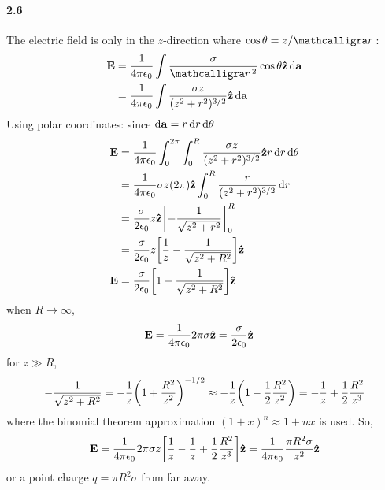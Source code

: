 \documentclass[../main.tex]{subfiles}
\begin{document}
\paragraph{2.6}
The electric field is only in the $z$-direction where $\cos\theta = z/\scriptr$:
\begin{align*}
    \vb{E} &= \frac{1}{4\pi\epsilon_0}
        \int \frac{\sigma}{\scriptr^2} \cos\theta \vu{z} \dd{\vb{a}} \\
    &= \frac{1}{4\pi\epsilon_0}
        \int \frac{\sigma z}{(z^2 + r^2)^{3/2}} \vu{z} \dd{\vb{a}}
\end{align*}
Using polar coordinates: since $\dd{\vb{a}} = r \dd{r} \dd{\theta} $
\begin{align*}
    \vb{E} &= \frac{1}{4\pi\epsilon_0}
        \int_0^{2\pi} \int_0^R \frac{\sigma z}{(z^2 + r^2)^{3/2}} \vu{z} r \dd{r} \dd{\theta} \\
    &= \frac{1}{4\pi\epsilon_0}
        \sigma z (2\pi) \vu{z} \int_0^R \frac{r}{(z^2 + r^2)^{3/2}} \dd{r} \\
    &= \frac{\sigma}{2\epsilon_0} z \vu{z} \qt[
            -\frac{1}{\sqrt{z^2 + r^2}}
        ]_0^R \\
    &= \frac{\sigma}{2\epsilon_0} z  \qt[
            \frac{1}{z} -\frac{1}{\sqrt{z^2 + R^2}}
        ] \vu{z} \\
    \vb E &= \frac{\sigma}{2\epsilon_0} \qt[1 - \frac{1}{\sqrt{z^2 + R^2}}] \vu{z}
\end{align*}
when $R \to \infty$,
\begin{align*}
    \vb{E} &= \frac{1}{4\pi\epsilon_0} 2\pi \sigma \vu{z} = \frac{\sigma}{2\epsilon_0} \vu{z}
\end{align*}
for $z \gg R$,
\begin{align*}
    -\frac{1}{\sqrt{z^2 + R^2}} = -\frac{1}{z} \qt(1 + \frac{R^2}{z^2})^{-1/2} \approx -\frac{1}{z}
    \qt(1 - \frac{1}{2} \frac{R^2}{z^2}) = -\frac{1}{z} + \frac{1}{2} \frac{R^2}{z^3}
\end{align*}
where the binomial theorem approximation $(1 + x)^n \approx 1 + nx$ is used. So,
\begin{align*}
    \vb{E} = \frac{1}{4\pi\epsilon_0} 2\pi \sigma z \qt[
        \frac{1}{z} - \frac{1}{z} + \frac{1}{2} \frac{R^2}{z^3}
    ] \vu{z} 
    = \frac{1}{4\pi\epsilon_0} \frac{\pi R^2 \sigma }{z^2} \vu{z}
\end{align*}
or a point charge $q = \pi R^2 \sigma$ from far away.
\newpage
\end{document}
